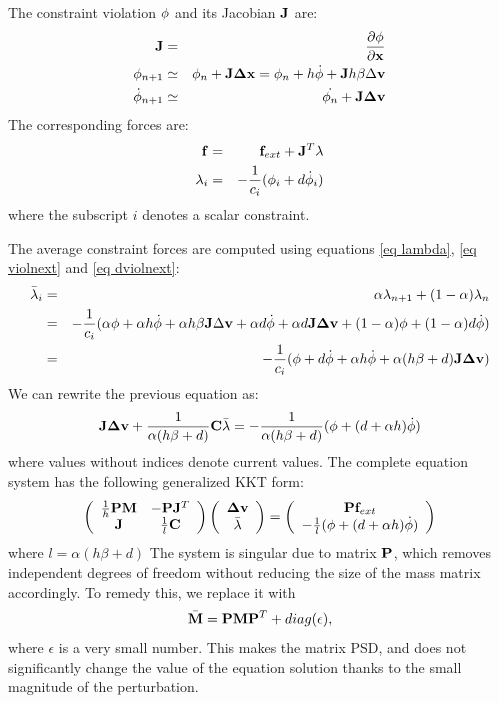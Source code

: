 The constraint violation $\violation$ and its Jacobian $\J$ are:
\begin{eqnarray}
 \J &=& \frac{\partial \vect \violation}{\partial \pos} \\
 \violnext &\simeq& \violcur + \J \dx = \violcur + h   \dviolation + \J h \beta \Delta \vel  \label{eq violnext}\\
\dviolnext &\simeq& \dviolcur + \J \dv \label{eq dviolnext}
\end{eqnarray}
The corresponding forces are:
\begin{eqnarray}
 \force &=& \forcext + \Jt \lam \\
 \lam_i &=& -\frac{1}{c_i} (  \violation_i + d \dviolation_i ) \label{eq lambda}
\end{eqnarray}
where the subscript $i$ denotes a scalar constraint.

The average constraint forces are computed  using equations \ref{eq lambda}, \ref{eq violnext} and \ref{eq dviolnext}:
\begin{eqnarray*}
 \avlam_i &=& \alpha \lnext + (1-\alpha) \lcur \\
&=& -\frac{1}{c_i} ( \alpha \violation + \alpha h \dviolation  + \alpha h \beta \J \Delta \vel + \alpha d \dviolation + \alpha d \J \dv + (1-\alpha)\violation + (1-\alpha) d \dviolation  ) \\
&=& -\frac{1}{c_i} ( \violation + d\dviolation + \alpha h \dviolation + \alpha(h\beta+d)\J \dv )
\end{eqnarray*}
We can rewrite the previous equation as:
\begin{equation} \label{eq bottom}
 \J \dv + \frac{1}{\alpha(h\beta+d)}\C\avlam = - \frac{1}{\alpha(h\beta+d)} (\violation + (d+\alpha h)\dviolation)
\end{equation}
where values without indices denote current values.
The complete equation system has the following generalized KKT form:
\begin{equation}
 \left( \begin{array}{cc}
\frac{1}{h}\P\M & -\P\Jt \\
\J & \frac{1}{l} \C \end{array}\right)
\left( \begin{array}{c}
\dv \\ \avlam
\end{array}\right) = \left( \begin{array}{c}
\P\forcext  \\
- \frac{1}{l} (\violation +(d+\alpha h) \dviolation)
\end{array}\right) 
\end{equation}
where $ l=\alpha(h \beta + d) $
The system is singular due to matrix $\P $, which removes independent degrees of freedom without reducing the size of the mass matrix accordingly.
To remedy this, we replace it with 
\begin{equation} \label{eq mbar}
\bar\M = \P \M \P^T + diag(\epsilon),
\end{equation}
 where $\epsilon$ is a very small number. 
This makes the matrix PSD, and does not significantly change the value of the equation solution thanks to the small magnitude of the perturbation.


